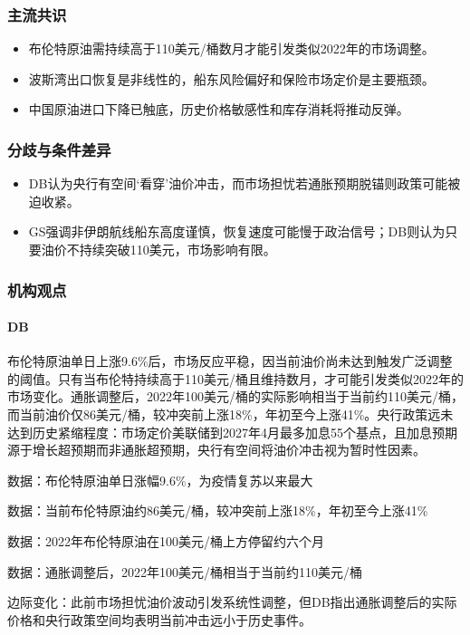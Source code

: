 \documentclass[11pt]{ctexart}
\begin{document}
\subsubsection*{主流共识}
\begin{itemize}
  \item 布伦特原油需持续高于110美元/桶数月才能引发类似2022年的市场调整。
  \item 波斯湾出口恢复是非线性的，船东风险偏好和保险市场定价是主要瓶颈。
  \item 中国原油进口下降已触底，历史价格敏感性和库存消耗将推动反弹。
\end{itemize}
\subsubsection*{分歧与条件差异}
\begin{itemize}
  \item DB认为央行有空间‘看穿’油价冲击，而市场担忧若通胀预期脱锚则政策可能被迫收紧。
  \item GS强调非伊朗航线船东高度谨慎，恢复速度可能慢于政治信号；DB则认为只要油价不持续突破110美元，市场影响有限。
\end{itemize}
\subsubsection*{机构观点}
\paragraph{DB} 布伦特原油单日上涨9.6\%后，市场反应平稳，因当前油价尚未达到触发广泛调整的阈值。只有当布伦特持续高于110美元/桶且维持数月，才可能引发类似2022年的市场变化。通胀调整后，2022年100美元/桶的实际影响相当于当前约110美元/桶，而当前油价仅86美元/桶，较冲突前上涨18\%，年初至今上涨41\%。央行政策远未达到历史紧缩程度：市场定价美联储到2027年4月最多加息55个基点，且加息预期源于增长超预期而非通胀超预期，央行有空间将油价冲击视为暂时性因素。
{\small\color{refgray}数据：布伦特原油单日涨幅9.6\%，为疫情复苏以来最大\par}
{\small\color{refgray}数据：当前布伦特原油约86美元/桶，较冲突前上涨18\%，年初至今上涨41\%\par}
{\small\color{refgray}数据：2022年布伦特原油在100美元/桶上方停留约六个月\par}
{\small\color{refgray}数据：通胀调整后，2022年100美元/桶相当于当前约110美元/桶\par}
{\small\color{refgray}边际变化：此前市场担忧油价波动引发系统性调整，但DB指出通胀调整后的实际价格和央行政策空间均表明当前冲击远小于历史事件。\par}
\end{document}
